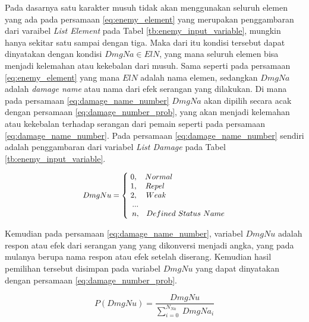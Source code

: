 Pada dasarnya satu karakter musuh tidak akan menggunakan seluruh elemen yang ada pada persamaan \ref{eq:enemy_element} yang merupakan penggambaran dari varaibel \textit{List Element} pada Tabel \ref{tb:enemy_input_variable}, mungkin hanya sekitar satu sampai dengan tiga. Maka dari itu kondisi tersebut dapat dinyatakan dengan kondisi $DmgNa \in ElN$, yang mana seluruh elemen bisa menjadi kelemahan atau kekebalan dari musuh. Sama seperti pada persamaan \ref{eq:enemy_element} yang mana $ElN$ adalah nama elemen, sedangkan $DmgNa$ adalah \textit{damage name} atau nama dari efek serangan yang dilakukan. Di mana pada persamaan \ref{eq:damage_name_number} $DmgNa$ akan dipilih secara acak dengan persamaan \ref{eq:damage_number_prob}, yang akan menjadi kelemahan atau kekebalan terhadap serangan dari pemain seperti pada persamaan \ref{eq:damage_name_number}. Pada persamaan \ref{eq:damage_name_number} sendiri adalah penggambaran dari variabel \textit{List Damage} pada Tabel \ref{tb:enemy_input_variable}. 
\vspace{1ex}

\begin{equation}\label{eq:damage_name_number}
\resizebox{0.5\textwidth}{!}{%
	$DmgNu = \left\{\begin{matrix} 
	\hspace{0.0em} 0,  & \hspace{-7.0em} Normal \\
	\hspace{0.0em} 1,  & \hspace{-8.0em} Repel \\
	\hspace{0.0em} 2,  & \hspace{-7.7em} Weak \\
	\hspace{0.5em} ... & \\
	\hspace{0.5em} n,  & Defined\ Status\ Name
	\end{matrix}\right.$%
}
\end{equation}

Kemudian pada persamaan \ref{eq:damage_name_number}, variabel $DmgNu$ adalah respon atau efek dari serangan yang yang dikonversi menjadi angka, yang pada mulanya berupa nama respon atau efek setelah diserang. Kemudian hasil pemilihan tersebut disimpan pada variabel $DmgNu$ yang dapat dinyatakan dengan persamaan \ref{eq:damage_number_prob}.
\vspace{1ex}

\begin{equation}\label{eq:damage_number_prob}
P(DmgNu) = \frac{DmgNu}{\sum_{i = 0}^{N_{Na}}\ DmgNa_{i}}
\end{equation}

